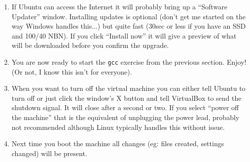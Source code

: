 \documentclass{lab}
\begin{document}
\begin{enumerate}
\item If Ubuntu can access the Internet it will probably bring up a ``Software Updater'' window. Installing updates is optional (don't get me started on the way Windows handles this...) but quite fast (30sec or less if you have an SSD and 100/40 NBN). If you click ``Install now'' it will give a preview of what will be downloaded before you confirm the upgrade.

\item You are now ready to start the \texttt{gcc} exercise from the previous section. Enjoy! (Or not, I know this isn't for everyone).

\item When you want to turn off the virtual machine you can either tell Ubuntu to turn off or just click the window's X button and tell VirtualBox to send the shutdown signal. It will close after a second or two. If you select ``power off the machine'' that is the equivalent of unplugging the power lead, probably not recommended although Linux typically handles this without issue.

\item Next time you boot the machine all changes (eg: files created, settings changed) will be present.

\end{enumerate}
\end{document}

